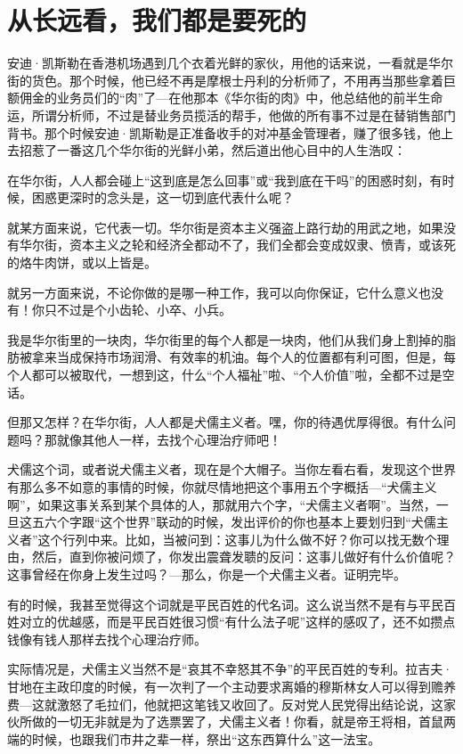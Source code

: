 \hypertarget{ux4eceux957fux8fdcux770bux6211ux4eecux90fdux662fux8981ux6b7bux7684}{%
\section{从长远看，我们都是要死的}\label{ux4eceux957fux8fdcux770bux6211ux4eecux90fdux662fux8981ux6b7bux7684}}

安迪·凯斯勒在香港机场遇到几个衣着光鲜的家伙，用他的话来说，一看就是华尔街的货色。那个时候，他已经不再是摩根士丹利的分析师了，不用再当那些拿着巨额佣金的业务员们的``肉''了---在他那本《华尔街的肉》中，他总结他的前半生命运，所谓分析师，不过是替业务员揽活的帮手，他做的所有事不过是在替销售部门背书。那个时候安迪·凯斯勒是正准备收手的对冲基金管理者，赚了很多钱，他上去招惹了一番这几个华尔街的光鲜小弟，然后道出他心目中的人生浩叹：

在华尔街，人人都会碰上``这到底是怎么回事''或``我到底在干吗''的困惑时刻，有时候，困惑更深时的念头是，这一切到底代表什么呢？

就某方面来说，它代表一切。华尔街是资本主义强盗上路行劫的用武之地，如果没有华尔街，资本主义之轮和经济全都动不了，我们全都会变成奴隶、愤青，或该死的烙牛肉饼，或以上皆是。

就另一方面来说，不论你做的是哪一种工作，我可以向你保证，它什么意义也没有！你只不过是个小齿轮、小卒、小兵。

我是华尔街里的一块肉，华尔街里的每个人都是一块肉，他们从我们身上割掉的脂肪被拿来当成保持市场润滑、有效率的机油。每个人的位置都有利可图，但是，每个人都可以被取代，一想到这，什么``个人福祉''啦、``个人价值''啦，全都不过是空话。

但那又怎样？在华尔街，人人都是犬儒主义者。嘿，你的待遇优厚得很。有什么问题吗？那就像其他人一样，去找个心理治疗师吧！

犬儒这个词，或者说犬儒主义者，现在是个大帽子。当你左看右看，发现这个世界有那么多不如意的事情的时候，你就尽情地把这个事用五个字概括---``犬儒主义啊''，如果这事关系到某个具体的人，那就用六个字，``犬儒主义者啊''。当然，一旦这五六个字跟``这个世界''联动的时候，发出评价的你也基本上要划归到``犬儒主义者''这个行列中来。比如，当被问到：这事儿为什么做不好？你可以找无数个理由，然后，直到你被问烦了，你发出震聋发聩的反问：这事儿做好有什么价值呢？这事曾经在你身上发生过吗？---那么，你是一个犬儒主义者。证明完毕。

有的时候，我甚至觉得这个词就是平民百姓的代名词。这么说当然不是有与平民百姓对立的优越感，而是平民百姓很习惯``有什么法子呢''这样的感叹了，还不如攒点钱像有钱人那样去找个心理治疗师。

实际情况是，犬儒主义当然不是``哀其不幸怒其不争''的平民百姓的专利。拉吉夫·甘地在主政印度的时候，有一次判了一个主动要求离婚的穆斯林女人可以得到赡养费---这就激怒了毛拉们，他就把这笔钱又收回了。反对党人民党得出结论说，这家伙所做的一切无非就是为了选票罢了，犬儒主义者！你看，就是帝王将相，首鼠两端的时候，也跟我们市井之辈一样，祭出``这东西算什么''这一法宝。

